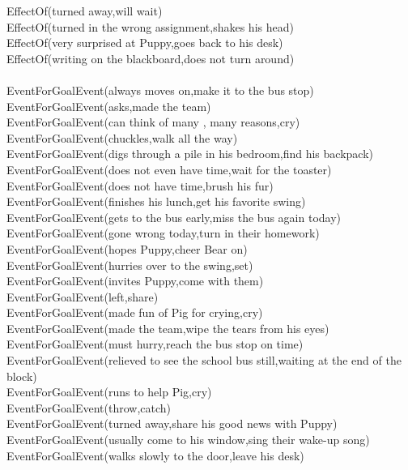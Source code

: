 \begin{multicols}{2}
\begin{footnotesize}
EffectOf(turned away,will wait) \\
EffectOf(turned in the wrong assignment,shakes his head) \\
EffectOf(very surprised at Puppy,goes back to his desk) \\
EffectOf(writing on the blackboard,does not turn around) \\
~\\
EventForGoalEvent(always moves on,make it to the bus stop) \\
EventForGoalEvent(asks,made the team) \\
EventForGoalEvent(can think of many , many reasons,cry) \\
EventForGoalEvent(chuckles,walk all the way) \\
EventForGoalEvent(digs through a pile in his bedroom,find his backpack) \\
EventForGoalEvent(does not even have time,wait for the toaster) \\
EventForGoalEvent(does not have time,brush his fur) \\
EventForGoalEvent(finishes his lunch,get his favorite swing) \\
EventForGoalEvent(gets to the bus early,miss the bus again today) \\
EventForGoalEvent(gone wrong today,turn in their homework) \\
EventForGoalEvent(hopes Puppy,cheer Bear on) \\
EventForGoalEvent(hurries over to the swing,set) \\
EventForGoalEvent(invites Puppy,come with them) \\
EventForGoalEvent(left,share) \\
EventForGoalEvent(made fun of Pig for crying,cry) \\
EventForGoalEvent(made the team,wipe the tears from his eyes) \\
EventForGoalEvent(must hurry,reach the bus stop on time) \\
EventForGoalEvent(relieved to see the school bus still,waiting at the end of the block) \\
EventForGoalEvent(runs to help Pig,cry) \\
EventForGoalEvent(throw,catch) \\
EventForGoalEvent(turned away,share his good news with Puppy) \\
EventForGoalEvent(usually come to his window,sing their wake-up song) \\
EventForGoalEvent(walks slowly to the door,leave his desk) \\

\end{footnotesize}
\end{multicols}
